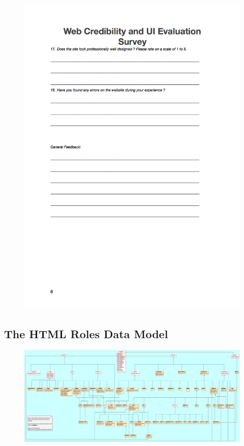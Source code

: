 \begin{figure}[H]
	\centering
	\includegraphics[scale=.7]{chapters/appendices/figures/6.png}
	\label{fig:6/6}
\end{figure}
\newpage



\begin{landscape}
\section{The HTML Roles Data Model}
\begin{figure}[H]
	\centering
	\includegraphics[scale=.29]{chapters/appendices/figures/rdf_model.png}
	\label{fig:roleModelHTML}
\end{figure}
\end{landscape}